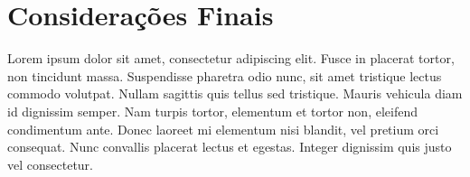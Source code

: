 \documentclass[a4paper, 12pt]{article}
\begin{document}
\section{Considerações Finais}

Lorem ipsum dolor sit amet, consectetur adipiscing elit. Fusce in placerat tortor, non tincidunt massa. Suspendisse pharetra odio nunc, sit amet tristique lectus commodo volutpat. Nullam sagittis quis tellus sed tristique. Mauris vehicula diam id dignissim semper. Nam turpis tortor, elementum et tortor non, eleifend condimentum ante. Donec laoreet mi elementum nisi blandit, vel pretium orci consequat. Nunc convallis placerat lectus et egestas. Integer dignissim quis justo vel consectetur.



\newpage
{}





\newpage
\end{document}
